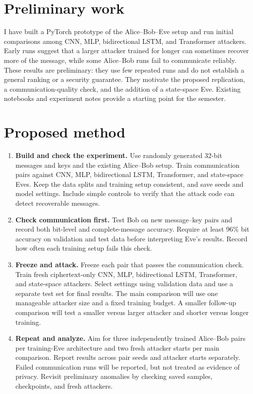 \documentclass[10pt,letterpaper]{article}
\begin{document}
\section{Preliminary work}
I have built a PyTorch prototype of the Alice--Bob--Eve setup and run initial comparisons among CNN, MLP, bidirectional LSTM, and Transformer attackers. Early runs suggest that a larger attacker trained for longer can sometimes recover more of the message, while some Alice--Bob runs fail to communicate reliably. These results are preliminary: they use few repeated runs and do not establish a general ranking or a security guarantee. They motivate the proposed replication, a communication-quality check, and the addition of a state-space Eve. Existing notebooks and experiment notes provide a starting point for the semester.

\section{Proposed method}
\begin{enumerate}
  \item \textbf{Build and check the experiment.} Use randomly generated 32-bit messages and keys and the existing Alice--Bob setup. Train communication pairs against CNN, MLP, bidirectional LSTM, Transformer, and state-space Eves. Keep the data splits and training setup consistent, and save seeds and model settings. Include simple controls to verify that the attack code can detect recoverable messages.
  \item \textbf{Check communication first.} Test Bob on new message--key pairs and record both bit-level and complete-message accuracy. Require at least 96\% bit accuracy on validation and test data before interpreting Eve's results. Record how often each training setup fails this check.
  \item \textbf{Freeze and attack.} Freeze each pair that passes the communication check. Train fresh ciphertext-only CNN, MLP, bidirectional LSTM, Transformer, and state-space attackers. Select settings using validation data and use a separate test set for final results. The main comparison will use one manageable attacker size and a fixed training budget. A smaller follow-up comparison will test a smaller versus larger attacker and shorter versus longer training.
  \item \textbf{Repeat and analyze.} Aim for three independently trained Alice--Bob pairs per training-Eve architecture and two fresh attacker starts per main comparison. Report results across pair seeds and attacker starts separately. Failed communication runs will be reported, but not treated as evidence of privacy. Revisit preliminary anomalies by checking saved samples, checkpoints, and fresh attackers.
\end{enumerate}
\end{document}

